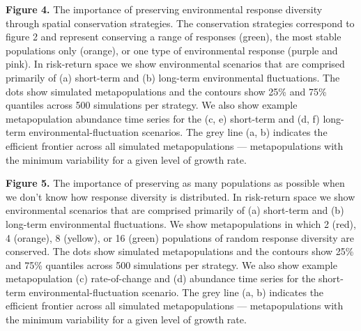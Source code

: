 \documentclass[11pt]{article}
\begin{document}
\begin{spacing}{1.6}

\textbf{Figure 4.} The importance of preserving environmental response diversity through spatial conservation strategies. The conservation strategies correspond to figure 2 and represent conserving a range of responses (green), the most stable populations only (orange), or one type of environmental response (purple and pink). In risk-return space we show environmental scenarios that are comprised primarily of (a) short-term and (b) long-term environmental fluctuations. The dots show simulated metapopulations and the contours show 25\% and 75\% quantiles across 500 simulations per strategy. We also show example metapopulation abundance time series for the (c, e) short-term and (d, f) long-term environmental-fluctuation scenarios. The grey line (a, b) indicates the efficient frontier across all simulated metapopulations --- metapopulations with the minimum variability for a given level of growth rate.


\textbf{Figure 5.} The importance of preserving as many populations as possible when we don't know how response diversity is distributed. In risk-return space we show environmental scenarios that are comprised primarily of (a) short-term and (b) long-term environmental fluctuations. We show metapopulations in which 2 (red), 4 (orange), 8 (yellow), or 16 (green) populations of random response diversity are conserved. The dots show simulated metapopulations and the contours show 25\% and 75\% quantiles across 500 simulations per strategy. We also show example metapopulation (c) rate-of-change and (d) abundance time series for the short-term environmental-fluctuation scenario. The grey line (a, b) indicates the efficient frontier across all simulated metapopulations --- metapopulations with the minimum variability for a given level of growth rate.

\clearpage

\end{spacing}

\setlength{\parskip}{8pt}
\setlength{\parindent}{0cm}

\begin{spacing}{1.1}

\setcounter{page}{1}
\nolinenumbers


\end{spacing}
\end{document}
